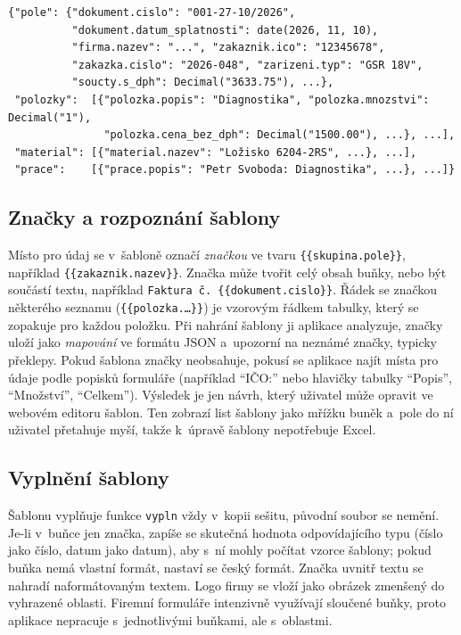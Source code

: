 \begin{lstlisting}[showstringspaces=false, columns=fullflexible, keepspaces=true, basicstyle=\footnotesize\ttfamily, caption={Tvar dat dokumentu (zkráceno)}, label={lst:data}]
{"pole": {"dokument.cislo": "001-27-10/2026",
          "dokument.datum_splatnosti": date(2026, 11, 10),
          "firma.nazev": "...", "zakaznik.ico": "12345678",
          "zakazka.cislo": "2026-048", "zarizeni.typ": "GSR 18V",
          "soucty.s_dph": Decimal("3633.75"), ...},
 "polozky":  [{"polozka.popis": "Diagnostika", "polozka.mnozstvi": Decimal("1"),
               "polozka.cena_bez_dph": Decimal("1500.00"), ...}, ...],
 "material": [{"material.nazev": "Ložisko 6204-2RS", ...}, ...],
 "prace":    [{"prace.popis": "Petr Svoboda: Diagnostika", ...}, ...]}
\end{lstlisting}

\subsection{Značky a rozpoznání šablony}

Místo pro údaj se v~šabloně označí \emph{značkou} ve tvaru \texttt{\{\{skupina.pole\}\}}, například \texttt{\{\{zakaznik.nazev\}\}}. Značka může tvořit celý obsah buňky, nebo být součástí textu, například \texttt{Faktura č. \{\{dokument.cislo\}\}}. Řádek se značkou některého seznamu (\texttt{\{\{polozka.\ldots\}\}}) je vzorovým řádkem tabulky, který se zopakuje pro každou položku. Při nahrání šablony ji aplikace analyzuje, značky uloží jako \emph{mapování} ve formátu JSON a~upozorní na neznámé značky, typicky překlepy. Pokud šablona značky neobsahuje, pokusí se aplikace najít místa pro údaje podle popisků formuláře (například \enquote{IČO:} nebo hlavičky tabulky \enquote{Popis}, \enquote{Množství}, \enquote{Celkem}). Výsledek je jen návrh, který uživatel může opravit ve webovém editoru šablon. Ten zobrazí list šablony jako mřížku buněk a~pole do ní uživatel přetahuje myší, takže k~úpravě šablony nepotřebuje Excel.

\subsection{Vyplnění šablony}

Šablonu vyplňuje funkce \texttt{vypln} vždy v~kopii sešitu, původní soubor se nemění. Je-li v~buňce jen značka, zapíše se skutečná hodnota odpovídajícího typu (číslo jako číslo, datum jako datum), aby s~ní mohly počítat vzorce šablony; pokud buňka nemá vlastní formát, nastaví se český formát. Značka uvnitř textu se nahradí naformátovaným textem. Logo firmy se vloží jako obrázek zmenšený do vyhrazené oblasti. Firemní formuláře intenzivně využívají sloučené buňky, proto aplikace nepracuje s~jednotlivými buňkami, ale s~oblastmi.

